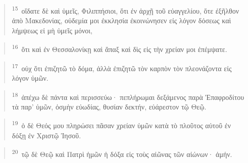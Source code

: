 \documentclass{article}
\newcommand{\currentverse}{1} %
\newcommand{\setcurrentverse}[1]{\renewcommand{\currentverse}{#1}}
\begin{document}
\begin{verse}

\setcurrentverse{15}

\setcounter{footnote}{0}

\textsuperscript{15}~οἴδατε δὲ καὶ ὑμεῖς, Φιλιππήσιοι, ὅτι ἐν ἀρχῇ τοῦ εὐαγγελίου, ὅτε ἐξῆλθον ἀπὸ Μακεδονίας, οὐδεμία μοι ἐκκλησία ἐκοινώνησεν εἰς λόγον δόσεως καὶ λήμψεως εἰ μὴ ὑμεῖς μόνοι,

\end{verse}

\begin{verse}

\setcurrentverse{16}

\setcounter{footnote}{0}

\textsuperscript{16}~ὅτι καὶ ἐν Θεσσαλονίκῃ καὶ ἅπαξ καὶ δὶς εἰς τὴν χρείαν μοι ἐπέμψατε.

\end{verse}

\begin{verse}

\setcurrentverse{17}

\setcounter{footnote}{0}

\textsuperscript{17}~οὐχ ὅτι ἐπιζητῶ τὸ δόμα, ἀλλὰ ἐπιζητῶ τὸν καρπὸν τὸν πλεονάζοντα εἰς λόγον ὑμῶν.

\end{verse}

\begin{verse}

\setcurrentverse{18}

\setcounter{footnote}{0}

\textsuperscript{18}~ἀπέχω δὲ πάντα καὶ περισσεύω· πεπλήρωμαι δεξάμενος παρὰ Ἐπαφροδίτου τὰ παρ’ ὑμῶν, ὀσμὴν εὐωδίας, θυσίαν δεκτήν, εὐάρεστον τῷ Θεῷ.

\end{verse}

\begin{verse}

\setcurrentverse{19}

\setcounter{footnote}{0}

\textsuperscript{19}~ὁ δὲ Θεός μου πληρώσει πᾶσαν χρείαν ὑμῶν κατὰ τὸ πλοῦτος αὐτοῦ ἐν δόξῃ ἐν Χριστῷ Ἰησοῦ.

\end{verse}

\begin{verse}

\setcurrentverse{20}

\setcounter{footnote}{0}

\textsuperscript{20}~τῷ δὲ Θεῷ καὶ Πατρὶ ἡμῶν ἡ δόξα εἰς τοὺς αἰῶνας τῶν αἰώνων· ἀμήν.

\end{verse}
\end{document}
